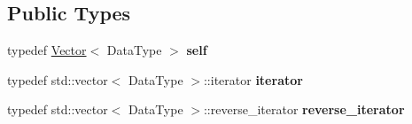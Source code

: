 \subsection*{Public Types}
\begin{DoxyCompactItemize}
\item 
\mbox{\label{classez_1_1objects_1_1Vector_ab7b578e86498287ae9b6dd7fb615ff15}} 
typedef \hyperlink{classez_1_1objects_1_1Vector}{Vector}$<$ Data\+Type $>$ {\bfseries self}
\item 
\mbox{\label{classez_1_1objects_1_1Vector_a251d6033c8797e9b6d76a97a9a4f0543}} 
typedef std\+::vector$<$ Data\+Type $>$\+::iterator {\bfseries iterator}
\item 
\mbox{\label{classez_1_1objects_1_1Vector_a20daf0d3c0f8b7a7f3c1a0ce0c4e0969}} 
typedef std\+::vector$<$ Data\+Type $>$\+::reverse\+\_\+iterator {\bfseries reverse\+\_\+iterator}
\end{DoxyCompactItemize}
